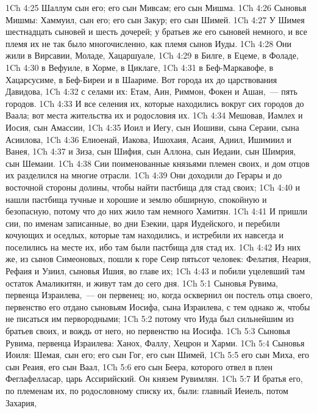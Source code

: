 \vs 1Ch 4:25 Шаллум сын его; его сын Мивсам; его сын Мишма.
\vs 1Ch 4:26 Сыновья Мишмы: Хаммуил, сын его; его сын Закур; его сын Шимей.
\vs 1Ch 4:27 У Шимея  шестнадцать сыновей и шесть дочерей; у братьев же его сыновей  немного, и все племя их не так было многочисленно, как племя сынов Иуды.
\rsbpar\vs 1Ch 4:28 Они жили в Вирсавии, Моладе, Хацаршуале,
\vs 1Ch 4:29 в Билге, в Ецеме, в Фоладе,
\vs 1Ch 4:30 в Вефуиле, в Хорме, в Циклаге,
\vs 1Ch 4:31 в Беф-Маркавофе, в Хацарсусиме, в Беф-Биреи и в Шаариме. Вот города их до царствования Давидова,
\vs 1Ch 4:32 с селами их: Етам, Аин, Риммон, Фокен и Ашан,~--- пять городов.
\vs 1Ch 4:33 И все селения их, которые находились вокруг сих городов до Ваала; вот места жительства их и родословия их.
\vs 1Ch 4:34 Мешовав, Иамлех и Иосия, сын Амассии,
\vs 1Ch 4:35 Иоил и Иегу, сын Иошиви, сына Сераии, сына Асиилова,
\vs 1Ch 4:36 Елиоенай, Иакова, Ишохаия, Асаия, Адиил, Ишимиил и Ванея,
\vs 1Ch 4:37 и Зиза, сын Шифия, сын Аллона, сын Иедаии, сын Шимрия, сын Шемаии.
\rsbpar\vs 1Ch 4:38 Сии поименованные  князьями племен своих, и дом отцов их разделился на многие отрасли.
\vs 1Ch 4:39 Они доходили до Герары и до восточной стороны долины, чтобы найти пастбища для стад своих;
\vs 1Ch 4:40 и нашли пастбища тучные и хорошие и землю обширную, спокойную и безопасную, потому что до них жило там  немного Хамитян.
\vs 1Ch 4:41 И пришли сии, по именам записанные, во дни Езекии, царя Иудейского, и перебили кочующих и оседлых, которые там находились, и истребили их навсегда и поселились на месте их, ибо там были пастбища для стад их.
\vs 1Ch 4:42 Из них же, из сынов Симеоновых, пошли к горе Сеир пятьсот человек: Фелатия, Неария, Рефаия и Узиил, сыновья Ишия,  во главе их;
\vs 1Ch 4:43 и побили уцелевший там остаток Амаликитян, и живут там до сего дня.
\vs 1Ch 5:1 Сыновья Рувима, первенца Израилева,~--- он первенец; но, когда осквернил он постель отца своего, первенство его отдано сыновьям Иосифа, сына Израилева, с тем однако ж, чтобы не писаться им первородными;
\vs 1Ch 5:2 потому что Иуда был сильнейшим из братьев своих, и вождь от него, но первенство  на Иосифа.
\vs 1Ch 5:3 Сыновья Рувима, первенца Израилева: Ханох, Фаллу, Хецрон и Харми.
\rsbpar\vs 1Ch 5:4 Сыновья Иоиля: Шемая, сын его; его сын Гог, его сын Шимей,
\vs 1Ch 5:5 его сын Миха, его сын Реаия, его сын Ваал,
\vs 1Ch 5:6 его сын Беера, которого отвел в плен Феглафелласар, царь Ассирийский. Он  князем Рувимлян.
\vs 1Ch 5:7 И братья его, по племенам их, по родословному списку их, были: главный Иеиель, потом Захария,
